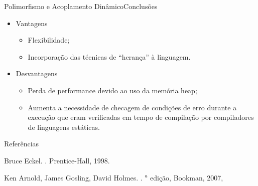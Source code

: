 \begin{frame}{Polimorfismo e Acoplamento Dinâmico}{Conclusões}

  \begin{itemize}
  \item  Vantagens
    \begin{itemize}
      \item Flexibilidade;
      \item Incorporação das técnicas de ``herança'' à linguagem.
    \end{itemize}

  \item Desvantagens
    \begin{itemize}
    \item Perda de performance devido ao uso da memória heap;
    \item Aumenta a necessidade de checagem de condições de erro durante a
      execução que eram verificadas em tempo de compilação por
      compiladores de linguagens estáticas.
    \end{itemize}
  \end{itemize}

\end{frame}

\begin{frame}[fragile]{Referências}

\begin{thebibliography}{Arnold, 2007}

 		    Bruce Eckel.
 .
\newblock	   Prentice-Hall, 1998.

  Ken Arnold, James Gosling, David Holmes.
.
$^a$ edição, Bookman, 2007, 
\end{thebibliography}

\end{frame}
